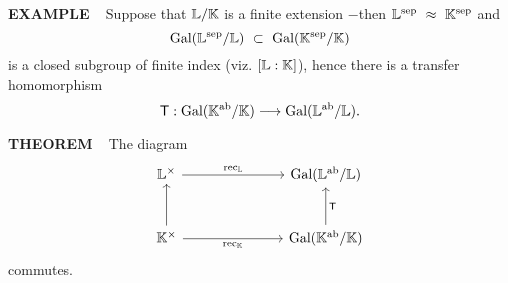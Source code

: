 \begin{x}{\small\bf EXAMPLE} \ %
Suppose that $\mathbb{L} / \mathbb{K}$ is a finite extension $-$then $\mathbb{L}^{\text{sep}} \ \approx \ \mathbb{K}^{\text{sep}}$ and 
\[
\Gal(\LL^\sep  / \LL) \ \subset \ \Gal(\K^\sep  / \K)
\]
is a closed subgroup of finite index (viz. $[\mathbb{L}:\mathbb{K}]$), hence there is a transfer homomorphism
\[
\mathsf{T}: \text{Gal}(\mathbb{K}^{\text{ab}}  / \mathbb{K}) \longrightarrow \text{Gal}(\mathbb{L}^{\text{ab}}  / \mathbb{L}).
\]
\end{x}
\vspace{0.1cm}

\begin{x}{\small\bf THEOREM} \ %
The diagram
\[
\begin{tikzcd}[sep=large]
{\LL^\times}  \ar{rr}{\rec_\LL}     &&{\Gal(\LL^\ab / \LL)}  \\
{\K^\times}  \ar{u} \ar{rr}[swap]{\rec_\K}        &&{\Gal(\K^\ab / \K)} \ar{u}[swap]{\Tee}
\end{tikzcd}
\]
commutes.
\end{x}
\vspace{0.1cm}
























